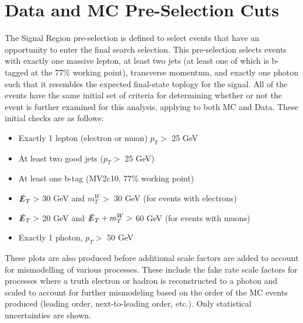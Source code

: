 \section{Data and MC Pre-Selection Cuts}
\label{sec:preselcuts}
The Signal Region pre-selection is defined to select events that have an opportunity to enter the final search selection.  This pre-selection selects events with exactly one massive lepton, at least two jets (at least one of which is b-tagged at the 77\% working point), transverse momentum, and exactly one photon such that it resembles the expected final-state toplogy for the signal.  All of the events have the same initial set of criteria for determining whether or not the event is further examined for this analysis, applying to both MC and Data.  These initial checks are as follows:
\begin{itemize}
\item Exactly 1 lepton (electron or muon) $p_T >$ 25 GeV
\item At least two good jets ($p_T >$ 25 GeV)
\item At least one b-tag (MV2c10, 77\% working point)
\item $\slashed{E}_T >$ 30 GeV and $m_T^W >$ 30 GeV (for events with electrons)
\item $\slashed{E}_T >$ 20 GeV and $\slashed{E}_T + m_T^W >$ 60 GeV (for events with muons)
\item Exactly 1 photon, $p_T >$ 50 GeV %
\end{itemize}

These plots are also produced before additional scale factors are added to account for mismodelling of various processes.  These include the fake rate scale factors for processes where a truth electron or hadron is reconstructed to a photon and scaled to account for further mismodeling based on the order of the MC events produced (leading order, next-to-leading order, etc.).  Only statistical uncertainties are shown.

